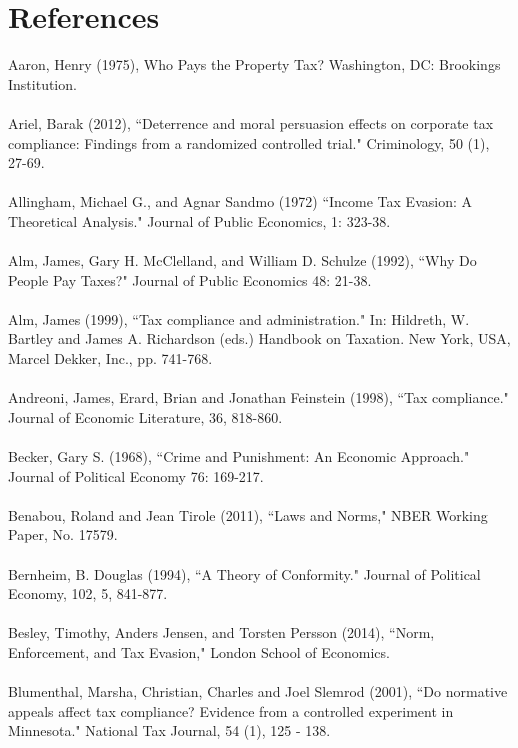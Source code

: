\documentclass[12pt,titlepage]{article}
\begin{document}
\newpage

\section*{References}

Aaron, Henry (1975), Who Pays the Property Tax? Washington, DC: Brookings Institution. \\
\\
Ariel, Barak (2012), ``Deterrence and moral persuasion effects on
corporate tax compliance: Findings from a randomized controlled
trial." Criminology, 50 (1), 27-69. \\
\\
Allingham, Michael G., and Agnar Sandmo (1972) ``Income Tax Evasion: A Theoretical
Analysis." Journal of Public Economics, 1: 323-38. \\
\\
Alm, James, Gary H. McClelland, and William D. Schulze (1992), ``Why Do People
Pay Taxes?" Journal of Public Economics 48: 21-38. \\
\\
Alm, James (1999), ``Tax compliance and administration." In: Hildreth, W. Bartley and James A. Richardson
(eds.) Handbook on Taxation. New York, USA, Marcel Dekker, Inc., pp. 741-768. \\
\\
Andreoni, James, Erard, Brian and Jonathan Feinstein (1998), ``Tax compliance." Journal of Economic
Literature, 36, 818-860. \\
\\
Becker, Gary S. (1968), ``Crime and Punishment: An Economic Approach."
Journal of Political Economy 76: 169-217.\\
\\
Benabou, Roland and Jean Tirole (2011), ``Laws and Norms," NBER Working Paper, No. 17579. \\
\\
Bernheim, B. Douglas (1994), ``A Theory of Conformity." Journal of Political Economy, 102, 5, 841-877. \\
\\
Besley, Timothy, Anders Jensen, and Torsten Persson (2014), ``Norm, Enforcement, and Tax Evasion," London School of Economics.  \\
\\
Blumenthal, Marsha, Christian, Charles and Joel Slemrod (2001), ``Do normative appeals affect tax
compliance? Evidence from a controlled experiment in Minnesota." National Tax Journal, 54 (1),
125 - 138. \\
\end{document}

